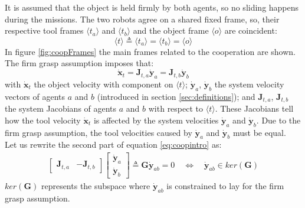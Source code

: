 It is assumed that the object is held firmly by both agents, so no sliding happens during the missions. The two robots agree on a shared fixed frame, so, their respective tool frames $\langle t_a \rangle$ and $\langle t_b \rangle$ and the object frame $\langle o \rangle$ are coincident: 
\begin{equation} 
\langle t \rangle \triangleq \langle t_a \rangle = \langle t_b \rangle = \langle o \rangle
\end{equation}
In figure \ref{fig:coopFrames} the main frames related to the cooperation are shown.\\

\noindent The firm grasp assumption imposes that:
\begin{equation}\label{eq:coopintro}
	\dot{\boldsymbol{x}}_t = \boldsymbol{J}_{t,a} \dot{\boldsymbol{y}}_a = \boldsymbol{J}_{t,b} \dot{\boldsymbol{y}}_b
\end{equation}
with $\dot{\boldsymbol{x}}_t$ the object velocity with component on $\langle t \rangle$; $\dot{\boldsymbol{y}}_a$, $\dot{\boldsymbol{y}}_b$ the system velocity vectors of agents $a$ and $b$ (introduced in section \ref{sec:definitions}); and $\boldsymbol{J}_{t,a}$, $\boldsymbol{J}_{t,b}$ the system Jacobians of agents $a$ and $b$ with respect to $\langle t \rangle$. These Jacobians tell how the tool velocity $\dot{\boldsymbol{x}}_t$ is affected by the system velocities $\dot{\boldsymbol{y}}_a$ and $\dot{\boldsymbol{y}}_b$. Due to the firm grasp assumption, the tool velocities caused by $\dot{\boldsymbol{y}}_a$ and $\dot{\boldsymbol{y}}_b$ must be equal.\\

\noindent Let us rewrite the second part of equation \eqref{eq:coopintro} as:
\begin{equation}\label{eq:coopintro2}
	\begin{gathered}
	\begin{bmatrix}
	\boldsymbol{J}_{t,a} & -\boldsymbol{J}_{t,b}
	\end{bmatrix}
	\begin{bmatrix}
	\dot{\boldsymbol{y}}_a \\ \dot{\boldsymbol{y}}_b
	\end{bmatrix}
	\triangleq \boldsymbol{G}\dot{\boldsymbol{y}}_{ab}=0 \quad \Longleftrightarrow \quad \dot{\boldsymbol{y}}_{ab} \in ker(\boldsymbol{G})
	\end{gathered}
\end{equation}
$ker(\boldsymbol{G})$ represents the subspace where $\dot{\boldsymbol{y}}_{ab}$ is constrained to lay for the firm grasp assumption.\\

